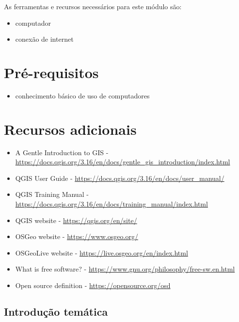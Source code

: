 \documentclass[
]{book}
\providecommand{\tightlist}{%
  \setlength{\itemsep}{0pt}\setlength{\parskip}{0pt}}
\theoremstyle{definition}
\theoremstyle{definition}
\theoremstyle{definition}
\theoremstyle{definition}
\theoremstyle{remark}
\begin{document}
As ferramentas e recursos necessários para este módulo são:

\begin{itemize}
\tightlist
\item
  computador
\item
  conexão de internet
\end{itemize}

\hypertarget{pruxe9-requisitos}{%
\section{Pré-requisitos}\label{pruxe9-requisitos}}

\begin{itemize}
\tightlist
\item
  conhecimento básico de uso de computadores
\end{itemize}

\hypertarget{recursos-adicionais}{%
\section{Recursos adicionais}\label{recursos-adicionais}}

\begin{itemize}
\tightlist
\item
  A Gentle Introduction to GIS - \url{https://docs.qgis.org/3.16/en/docs/gentle_gis_introduction/index.html}
\item
  QGIS User Guide - \url{https://docs.qgis.org/3.16/en/docs/user_manual/}
\item
  QGIS Training Manual - \url{https://docs.qgis.org/3.16/en/docs/training_manual/index.html}
\item
  QGIS website - \url{https://qgis.org/en/site/}
\item
  OSGeo website - \url{https://www.osgeo.org/}
\item
  OSGeoLive website - \url{https://live.osgeo.org/en/index.html}
\item
  What is free software? - \url{https://www.gnu.org/philosophy/free-sw.en.html}
\item
  Open source definition - \url{https://opensource.org/osd}
\end{itemize}

\hypertarget{introduuxe7uxe3o-temuxe1tica}{%
\subsection{Introdução temática}\label{introduuxe7uxe3o-temuxe1tica}}
\end{document}
